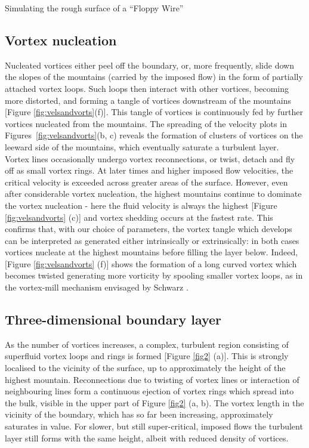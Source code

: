 \begin{chapter}{\label{cha:afm}Simulating the rough surface of a ``Floppy Wire''}
\subsection{Vortex nucleation}
Nucleated vortices either peel off the boundary, or, more frequently, slide
down the slopes of the mountains (carried by the imposed flow) in the form of partially attached vortex loops.
Such loops then interact with other vortices, becoming more distorted, and forming a tangle of vortices downstream of the mountains [Figure \ref{fig:velsandvorts}(f)].  This tangle of vortices is continuously fed by further vortices nucleated from the mountains.  The spreading of the velocity plots in Figures~\ref{fig:velsandvorts}(b, c) reveals
the formation of clusters of vortices on the leeward side of the mountains, which eventually saturate a
turbulent layer.  Vortex lines occasionally undergo vortex reconnections, or twist, detach and fly off as small 
vortex rings. At later times and higher imposed flow velocities, the critical velocity is exceeded across greater areas of the surface.  However, even after considerable vortex nucleation, the highest mountains continue to dominate the vortex nucleation - here the fluid velocity is always the highest [Figure \ref{fig:velsandvorts} (c)] and vortex shedding occurs at the fastest rate. This confirms that, with our choice of parameters,
the vortex tangle which develops can be interpreted as generated either
intrinsically or extrinsically: in both cases vortices nucleate 
at the highest mountains before filling the layer below.
Indeed, [Figure \ref{fig:velsandvorts} (f)] shows the formation of a long curved
vortex which becomes twisted generating more vorticity  by spooling smaller vortex loops, 
as in the vortex-mill mechanism envisaged by Schwarz \cite{PhysRevLett.64.1130}.

\subsection{Three-dimensional boundary layer}
As the number of vortices increases, a complex,
turbulent region consisting of superfluid vortex loops and rings is 
formed [Figure \ref{fig2} (a)].  This is strongly localised to the vicinity of the surface, up to approximately the height of the highest mountain. Reconnections due to twisting of vortex lines or interaction of neighbouring lines form a continuous ejection of vortex rings which spread into the bulk, visible in
the upper part of Figure \ref{fig2} (a, b). The vortex length in the vicinity of the boundary, which has so far been increasing, approximately saturates in value. For slower, but still super-critical, imposed flows the turbulent layer still forms with the same height, albeit with reduced density of vortices.


\end{chapter}
